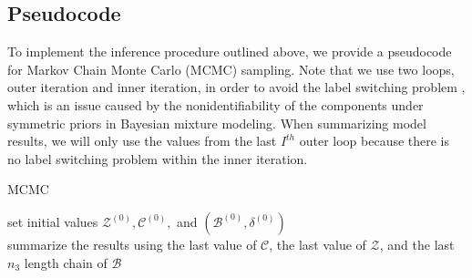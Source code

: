 \documentclass[a4paper]{article}
\begin{document}
 \subsection{Pseudocode}  \label{subsec: Pseudocode}
 To implement the inference procedure outlined above, we provide a pseudocode for Markov Chain Monte Carlo (MCMC) sampling. Note that we use two loops, outer iteration and inner iteration, in order to avoid the label switching problem \citep{jasra2005markov}, which is an issue caused by the nonidentifiability of the components under symmetric priors in Bayesian mixture modeling. When summarizing model results, we will only use the values from the last $I^{th}$ outer loop because there is no label switching problem within the inner iteration.
 \begin{algorithm}[H]
 	\SetAlgoLined
 	\caption{MCMC}
 	set initial values $\mathcal{Z}^{(0)}, \mathcal{C}^{(0)}, $ and $(\mathcal{B}^{(0)}, \delta^{(0)})$\\
 		summarize the results using the last value of $\mathcal{C}$, the last value of $\mathcal{Z}$, and the last $n_3$ length chain of $\mathcal{B}$
 \end{algorithm}
\end{document}
